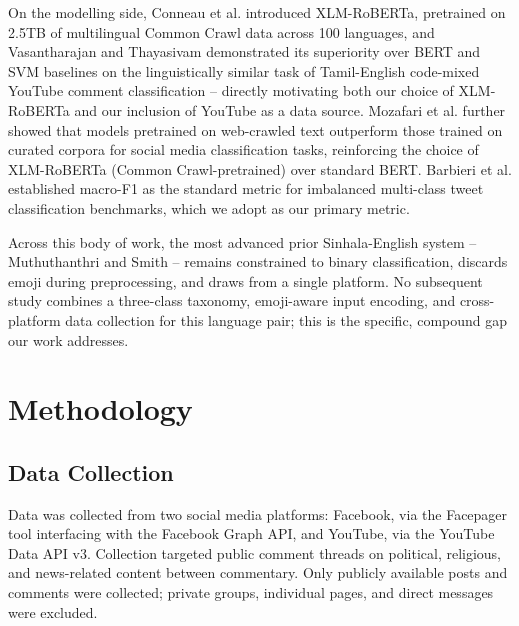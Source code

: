 \documentclass[journal]{IEEEtran}
\begin{document}
On the modelling side, Conneau et al. \cite{conneau2020} introduced
XLM-RoBERTa, pretrained on 2.5TB of multilingual Common Crawl data across
100 languages, and Vasantharajan and Thayasivam \cite{vasantharajan2022}
demonstrated its superiority over BERT and SVM baselines on the
linguistically similar task of Tamil-English code-mixed YouTube comment
classification -- directly motivating both our choice of XLM-RoBERTa and
our inclusion of YouTube as a data source. Mozafari et al.
\cite{mozafari2020} further showed that models pretrained on web-crawled
text outperform those trained on curated corpora for social media
classification tasks, reinforcing the choice of XLM-RoBERTa (Common
Crawl-pretrained) over standard BERT. Barbieri et al. \cite{barbieri2020}
established macro-F1 as the standard metric for imbalanced multi-class
tweet classification benchmarks, which we adopt as our primary metric.

Across this body of work, the most advanced prior Sinhala-English
system -- Muthuthanthri and Smith \cite{muthuthanthri2024} -- remains
constrained to binary classification, discards emoji during
preprocessing, and draws from a single platform. No subsequent study
combines a three-class taxonomy, emoji-aware input encoding, and
cross-platform data collection for this language pair; this is the
specific, compound gap our work addresses.

\section{Methodology}

\subsection{Data Collection}

Data was collected from two social media platforms: Facebook, via the
Facepager tool interfacing with the Facebook Graph API, and YouTube, via
the YouTube Data API v3. %
Collection targeted public comment threads on political, religious, and
news-related content between %
commentary. Only publicly available posts and comments were collected;
private groups, individual pages, and direct messages were excluded.
\end{document}
